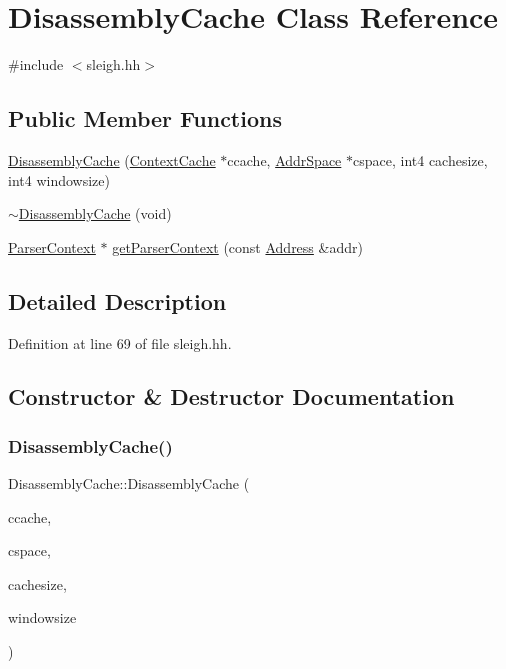 \hypertarget{class_disassembly_cache}{}\section{Disassembly\+Cache Class Reference}
\label{class_disassembly_cache}


{\ttfamily \#include $<$sleigh.\+hh$>$}

\subsection*{Public Member Functions}
\begin{DoxyCompactItemize}
\item 
\mbox{\hyperlink{class_disassembly_cache_a3473405cd9c2d6d890c0b28376fde40a}{Disassembly\+Cache}} (\mbox{\hyperlink{class_context_cache}{Context\+Cache}} $\ast$ccache, \mbox{\hyperlink{class_addr_space}{Addr\+Space}} $\ast$cspace, int4 cachesize, int4 windowsize)
\item 
\mbox{\hyperlink{class_disassembly_cache_a78395c2e69a662650170fdfc8b23af74}{$\sim$\+Disassembly\+Cache}} (void)
\item 
\mbox{\hyperlink{class_parser_context}{Parser\+Context}} $\ast$ \mbox{\hyperlink{class_disassembly_cache_afab4ffc5dc52eb4cc6da82e13a1d5107}{get\+Parser\+Context}} (const \mbox{\hyperlink{class_address}{Address}} \&addr)
\end{DoxyCompactItemize}


\subsection{Detailed Description}


Definition at line 69 of file sleigh.\+hh.



\subsection{Constructor \& Destructor Documentation}
\mbox{\label{class_disassembly_cache_a3473405cd9c2d6d890c0b28376fde40a}} 
\subsubsection{\texorpdfstring{DisassemblyCache()}{DisassemblyCache()}}
{\footnotesize\ttfamily Disassembly\+Cache\+::\+Disassembly\+Cache (\begin{DoxyParamCaption}\item[{\mbox{\hyperlink{class_context_cache}{Context\+Cache}} $\ast$}]{ccache,  }\item[{\mbox{\hyperlink{class_addr_space}{Addr\+Space}} $\ast$}]{cspace,  }\item[{int4}]{cachesize,  }\item[{int4}]{windowsize }\end{DoxyParamCaption})}



